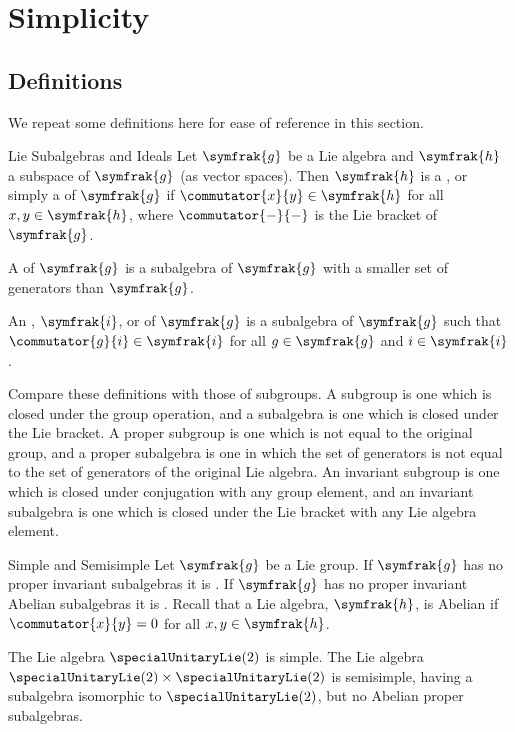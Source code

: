 \documentclass[fleqn]{NotesClass}
\renewcommand{\lie}[1]{\symfrak{#1}}
\begin{document}
    \chapter{Simplicity}
    \section{Definitions}
    We repeat some definitions here for ease of reference in this section.
    \begin{dfn}{Lie Subalgebras and Ideals}{}
        Let \(\lie{g}\) be a Lie algebra and \(\lie{h}\) a subspace of \(\lie{g}\) (as vector spaces).
        Then \(\lie{h}\) is a , or simply a  of \(\lie{g}\) if \(\commutator{x}{y} \in \lie{h}\) for all \(x, y \in \lie{h}\), where \(\commutator{-}{-}\) is the Lie bracket of \(\lie{g}\).
        
        A  of \(\lie{g}\) is a subalgebra of \(\lie{g}\) with a smaller set of generators than \(\lie{g}\).
        
        An , \(\lie{i}\), or  of \(\lie{g}\) is a subalgebra of \(\lie{g}\) such that \(\commutator{g}{i} \in \lie{i}\) for all \(g \in \lie{g}\) and \(i \in \lie{i}\).
    \end{dfn}
    Compare these definitions with those of subgroups.
    A subgroup is one which is closed under the group operation, and a subalgebra is one which is closed under the Lie bracket.
    A proper subgroup is one which is not equal to the original group, and a proper subalgebra is one in which the set of generators is not equal to the set of generators of the original Lie algebra.
    An invariant subgroup is one which is closed under conjugation with any group element, and an invariant subalgebra is one which is closed under the Lie bracket with any Lie algebra element.
    
    \begin{dfn}{Simple and Semisimple}{}
        Let \(\lie{g}\) be a Lie group.
        If \(\lie{g}\) has no proper invariant subalgebras it is .
        If \(\lie{g}\) has no proper invariant Abelian subalgebras it is .
        Recall that a Lie algebra, \(\lie{h}\), is Abelian if \(\commutator{x}{y} = 0\) for all \(x, y \in \lie{h}\).
    \end{dfn}
    
    \begin{exm}{}{}
        The Lie algebra \(\specialUnitaryLie(2)\) is simple.
        The Lie algebra \(\specialUnitaryLie(2) \times \specialUnitaryLie(2)\) is semisimple, having a subalgebra isomorphic to \(\specialUnitaryLie(2)\), but no Abelian proper subalgebras.
    \end{exm}
    
\end{document}
